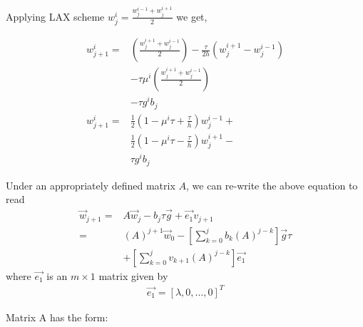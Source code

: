 \documentclass{ifacconf}
\begin{document}
Applying LAX scheme $w_j^i = \frac{w_j^{i-1} + w_j^{i+1}}{2}$ we get,

\begin{align*}
	w^i_{j+1} =& \left( \frac{w_j^{i+1} + w_j^{i-1}}{2} \right)
	-\frac{\tau}{2h}(w_j^{i+1}-w_j^{i-1}) \\
		&-\tau\mu^i\left( \frac{w_j^{i+1} + w_j^{i-1}}{2} \right)  \\
		&- \tau g^i b_j\\
	w^i_{j+1} =& \frac{1}{2}\left( 1-\mu^i\tau + \frac{\tau}{h} \right) w^{i-1}_j + \\
	           & \frac{1}{2}\left( 1-\mu^i\tau - \frac{\tau}{h} \right) w^{i+1}_j - \\
		   & \tau g^i b_j
\end{align*}

Under an appropriately defined matrix $A$, we can re-write the above equation to read
\begin{align}
	\vec{w}_{j+1} =& A\vec{w}_j - b_j\tau\vec{g} + \vec{e_1}v_{j+1} \\
	=& (A)^{j+1} \vec{w}_0 - \left[ \sum_{k=0}^j b_k (A)^{j-k} \right]\vec{g}\tau \\
	&+ \left[ \sum_{k=0}^j v_{k+1}(A)^{j-k} \right]\vec{e_1} \nonumber
\end{align}
where $\vec{e_1}$ is an $m\times1$ matrix given by
\begin{align}
	\vec{e_1} = \left[ \lambda,0,\dots,0 \right]^T
\end{align}

Matrix A has the form:
\end{document}
